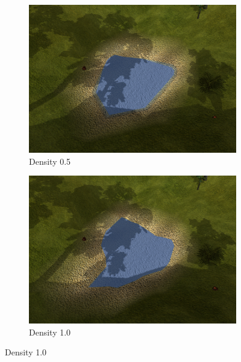 \begin{figure}[H]
\begin{subfigure}{.5\textwidth}
  \centering
  \includegraphics[width=0.9\linewidth]{images/terrainDensityComparison1_05.jpg}
  \caption{Density 0.5}
  \label{fig:textureDensity05}
\end{subfigure}%
\begin{subfigure}{.5\textwidth}
  \centering
  \includegraphics[width=0.9\linewidth]{images/terrainDensityComparison1_1.jpg}
  \caption{Density 1.0}
  \label{fig:textureDensity1}
\end{subfigure}%


\end{figure}
